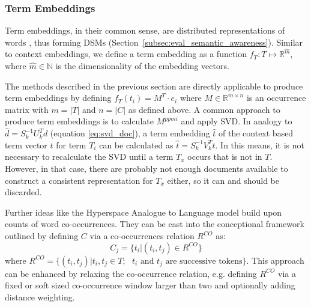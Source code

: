 \subsubsection{Term Embeddings}
\label{sec:term_embeddings}
Term embeddings, in their common sense, are distributed representations of words \autocite{bengio_neural_2003}, thus forming \acp{DSM} (Section~\ref{subsec:eval_semantic_awareness}). Similar to context embeddings, we define a term embedding as a function $f_T:T \mapsto \mathbb{R}^{\hat{m}}$, where $\hat{m} \in \mathbb{N}$ is the dimensionality of the embedding vectors.

The methods described in the previous section are directly applicable to produce term embeddings by defining $f_T(t_i) = M^T \cdot e_i$ where $M \in \mathbb{R}^{m \times n}$ is an occurrence matrix with $m = |T|$ and $n = |C|$ as defined above. A common approach to produce term embeddings is to calculate $M^{ppmi}$ and apply \ac{SVD}. In analogy to $\hat{d} = S_k^{-1}U_k^Td$ (equation \eqref{eq:svd_doc}), a term embedding $\hat{t}$ of the context based term vector $t$ for term $T_i$ can be calculated as $\hat{t} = S_k^{-1}V_k^Tt$. In this means, it is not necessary to recalculate the \ac{SVD} until a term $T_x$ occurs that is not in $T$. However, in that case, there are probably not enough documents available to construct a consistent  representation for $T_x$ either, so it can and should be discarded. %

Further ideas like the Hyperspace Analogue to Language model \autocite{lund_producing_1996} build upon counts of word co-occurrences. They can be cast into the conceptional framework outlined by defining $C$ via a co-occurrences relation $R^{CO}$ as:%
\begin{equation} \label{eq:co}
C_j = \{t_i|(t_i, t_j) \in R^{CO}\}
\end{equation}
where $R^{CO} = \{(t_i, t_j)|t_i, t_j \in T; \text{ $t_i$ and $t_j$ are successive tokens}\}$. This approach can be enhanced by relaxing the co-occurrence relation, e.g. defining $R^{CO}$ via a fixed or soft sized co-occurrence window larger than two and optionally adding distance weighting.

